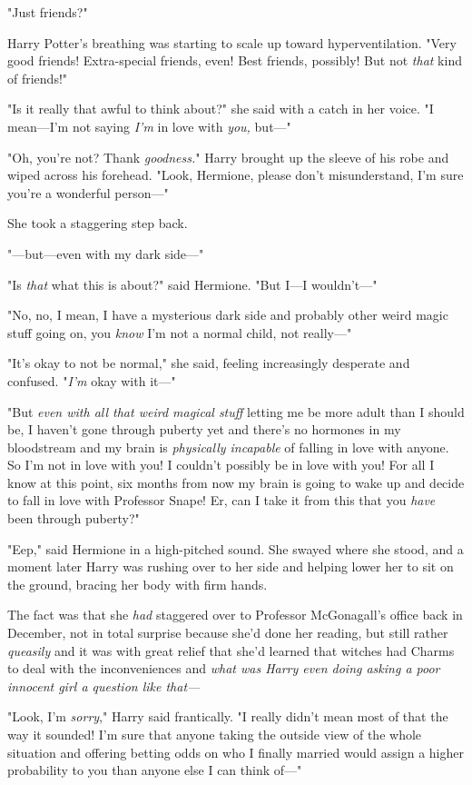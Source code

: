 "Just friends?"

Harry Potter's breathing was starting to scale up toward hyperventilation.
"Very good friends! Extra-special friends, even! Best friends,
possibly! But not \emph{that} kind of friends!"

"Is it really that awful to think about?" she said with a catch in her voice.
"I mean---I'm not saying \emph{I'm} in love with \emph{you,} but---"

"Oh, you're not? Thank \emph{goodness.}" Harry brought up the sleeve of his
robe and wiped across his forehead. "Look, Hermione, please don't
misunderstand, I'm sure you're a wonderful person---"

She took a staggering step back.

"---but---even with my dark side---"

"Is \emph{that} what this is about?" said Hermione. "But I---I wouldn't---"

"No, no, I mean, I have a mysterious dark side and probably other weird magic
stuff going on, you \emph{know} I'm not a normal child, not really---"

"It's okay to not be normal," she said, feeling increasingly desperate and
confused. "\emph{I'm} okay with it---"

"But \emph{even with all that weird magical stuff} letting me be more adult
than I should be, I haven't gone through puberty yet and there's no hormones in
my bloodstream and my brain is \emph{physically incapable} of falling in love
with anyone. So I'm not in love with you! I couldn't possibly be in love with
you! For all I know at this point, six months from now my brain is going to
wake up and decide to fall in love with Professor Snape! Er, can I take it from
this that you \emph{have} been through puberty?"

"Eep," said Hermione in a high-pitched sound. She swayed where she stood, and a
moment later Harry was rushing over to her side and helping lower her to sit on
the ground, bracing her body with firm hands.

The fact was that she \emph{had} staggered over to Professor McGonagall's
office back in December, not in total surprise because she'd done her reading,
but still rather \emph{queasily} and it was with great relief that she'd
learned that witches had Charms to deal with the inconveniences and \emph{what
was Harry even doing asking a poor innocent girl a question like that---}

"Look, I'm \emph{sorry}," Harry said frantically. "I really didn't mean most of
that the way it sounded! I'm sure that anyone taking the outside view of the
whole situation and offering betting odds on who I finally married would assign
a higher probability to you than anyone else I can think of---"

